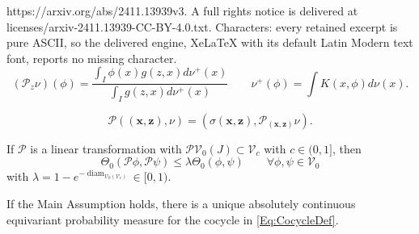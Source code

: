 \documentclass[10pt,a4paper]{amsart}
\DeclareMathOperator{\diam}{diam}
\newcommand{\bo}{\boldsymbol}
\newcommand{\mc}{\mathcal}
\begin{document}
https://arxiv.org/abs/2411.13939v3. A full rights notice is delivered at licenses/arxiv-2411.13939-CC-BY-4.0.txt. Characters: every retained excerpt is pure ASCII, so the delivered engine, XeLaTeX with its default Latin Modern text font, reports no missing character.
\begin{equation}\label{Eq:Evolution}
(\mc P_z\nu)(\phi)= \frac{\int _I\phi(x)g(z,x)d\nu^+(x)}{\int _Ig(z,x)d\nu^+(x)}\quad\quad \nu^+(\phi)=\int K(x,\phi)d\nu(x).
\end{equation}

\begin{equation}\label{Eq:CocycleDef}
\mc P((\bo x,\bo z), \nu)=(\sigma(\bo x,\bo z),\mc P_{(\bo x,\bo z)}\nu).
\end{equation}

\begin{corollary}\label{Cor:Contraction}
If $\mc P$ is a linear transformation with $\mc P\mc V_0(J)\subset \mc V_c$ with $c\in(0,1]$, then
\[
\Theta_0(\mc P\phi,\mc P\psi)\le \lambda\Theta_0(\phi,\psi)\quad\quad\forall\phi,\psi\in\mc V_0
\]
with $\lambda=1-e^{-\diam_{\mc V_0(\mc V_c)}}\in[0,1)$.
\end{corollary}

\begin{proposition}
If the Main Assumption holds, there is a unique absolutely continuous equivariant probability measure for the cocycle in \eqref{Eq:CocycleDef}.
\end{proposition}
\end{document}
